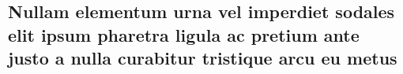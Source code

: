 \documentclass[
  12pt,				%
  openright,			%
  twoside,			%
  a4paper,			%
  english,			%
  french,				%
  spanish,			%
  brazil,				%
  ]{abntex2}
\begin{document}
\lipsum[31-33]

\postextual



%
%


\begin{apendicesenv}



  \lipsum[50]

  \chapter{Nullam elementum urna vel imperdiet sodales elit ipsum pharetra ligula
    ac pretium ante justo a nulla curabitur tristique arcu eu metus}
  \lipsum[55-57]

\end{apendicesenv}


\end{document}
